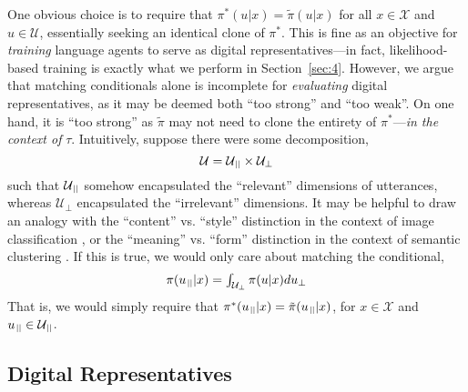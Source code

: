 One obvious choice is to require that $\pi^{*}(u|x)=\tilde{\pi}(u|x)$ for all $x\in\mathcal{X}$ and $u\in\mathcal{U}$, essentially seeking an identical clone of $\pi^{*}$.
%
This is fine as an objective for \textit{training} language agents to serve as digital representatives---in fact, likelihood-based training is exactly what we perform in Section~\ref{sec:4}.
%
However, we argue that matching conditionals alone is incomplete for \textit{evaluating} digital representatives, as it may be deemed both ``too strong'' and ``too weak''.
%
On one hand, it is ``too strong'' as $\tilde{\pi}$ may not need to clone the entirety of $\pi^{*}$---\textit{in the context of} $\tau$. Intuitively, suppose there were some decomposition,
%
\begin{equation}
\mathcal{U}=\mathcal{U}_{\para}\times\mathcal{U}_{\bot}
\end{equation}
%
such that $\mathcal{U}_{\para}$ somehow encapsulated the ``relevant'' dimensions of utterances, whereas $\mathcal{U}_{\bot}$ encapsulated the ``irrelevant'' dimensions.
%
It may be helpful to draw an analogy with the ``content'' vs. ``style'' distinction in the context of image classification \cite{wang2017effectiveness}, or the ``meaning'' vs. ``form'' distinction in the context of semantic clustering \cite{kuhn2023semantic}.
%
If this is true, we would only care about matching the conditional,
%
\begin{equation}
\pi(u_{\para}|x)
=
\textstyle\int_{\mathcal{U}_{\bot}}\pi(u|x)du_{\bot}
\end{equation}
%
That is, we would simply require that $
\pi^{*}(u_{\para}|x)
=
\tilde{\pi}(u_{\para}|x)
$, for $x\in\mathcal{X}$ and $u_{\para}\in\mathcal{U}_{\para}$.
%

\subsection{Digital Representatives}

